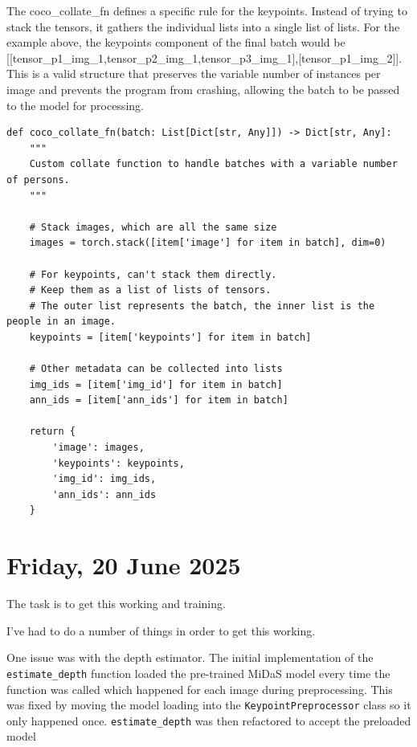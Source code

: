 The coco\_collate\_fn defines a specific rule for the keypoints.
Instead of trying to stack the tensors, it gathers the individual lists into a
single list of lists. For the example above, the keypoints component of the
final batch would be [[tensor\_p1\_img\_1,tensor\_p2\_img\_1,tensor\_p3\_img\_1],[tensor\_p1\_img\_2]]. This
is a valid structure that preserves the variable number of instances per image
and prevents the program from crashing, allowing the batch to be passed to the
model for processing.


\begin{lstlisting}[style=pythonstyle,title={Custom collation function},label={code:dataloader_collate_fn}]
def coco_collate_fn(batch: List[Dict[str, Any]]) -> Dict[str, Any]:
    """
    Custom collate function to handle batches with a variable number of persons.
    """

    # Stack images, which are all the same size
    images = torch.stack([item['image'] for item in batch], dim=0)

    # For keypoints, can't stack them directly.
    # Keep them as a list of lists of tensors.
    # The outer list represents the batch, the inner list is the people in an image.
    keypoints = [item['keypoints'] for item in batch]
    
    # Other metadata can be collected into lists
    img_ids = [item['img_id'] for item in batch]
    ann_ids = [item['ann_ids'] for item in batch]

    return {
        'image': images,
        'keypoints': keypoints,
        'img_id': img_ids,
        'ann_ids': ann_ids
    }
\end{lstlisting}

\section[2025/06/20]{Friday, 20 June 2025}
\label{sec:20250620}

The task is to get this working and training.

I've had to do a number of things in order to get this working.

One issue was with the depth estimator. The initial implementation of the
\texttt{estimate\_depth} function loaded the pre-trained MiDaS model
every time the function was called which happened for each image during preprocessing.
This was fixed by moving the model loading into the \texttt{KeypointPreprocessor}
class so it only happened once. \texttt{estimate\_depth} was then refactored
to accept the preloaded model

